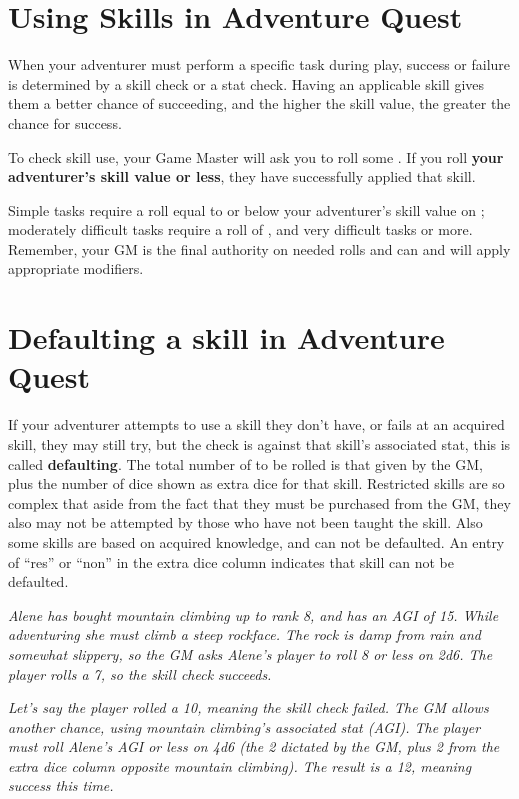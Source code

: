 \begin{multicols*}{2}
\section{Using Skills in Adventure Quest}
When your adventurer must perform a specific task during play, success or failure is determined by a skill check or a stat check. Having an applicable skill gives them a better chance of succeeding, and the higher the skill value, the greater the chance for success.

To check skill use, your Game Master will ask you to roll some . If you roll \textbf{your adventurer’s skill value or less}, they have successfully applied that skill.

Simple tasks require a roll equal to or below your adventurer’s skill value on ; moderately difficult tasks require a roll of , and very difficult tasks  or more. Remember, your GM is the final authority on needed rolls and can and will apply appropriate modifiers.
\section{Defaulting a skill in Adventure Quest}
If your adventurer attempts to use a skill they don't have, or fails at an acquired skill, they may still try, but the check is against that skill’s associated stat, this is called \textbf{defaulting}. The total number of  to be rolled is that given by the GM, plus the number of dice shown as extra dice for that skill. Restricted skills are so complex that aside from the fact that they must be purchased from the GM, they also may not be attempted by those who have not been taught the skill. Also some skills are based on acquired knowledge, and can not be defaulted. An entry of “res” or “non” in the extra dice column indicates that skill can not be defaulted.

\textit{Alene has bought mountain climbing up to rank 8, and has an AGI of 15. While adventuring she must climb a steep rockface. The rock is damp from rain and somewhat
slippery, so the GM asks Alene’s player to roll 8 or less on 2d6. The player rolls a 7, so the skill check succeeds.}

\textit{Let’s say the player rolled a 10, meaning the skill check failed. The GM allows another chance, using mountain climbing’s associated stat (AGI). The player must roll Alene’s AGI or less on 4d6 (the 2 dictated by the GM, plus 2 from the extra dice column opposite mountain climbing). The result is a 12, meaning success this time.}

\end{multicols*}
